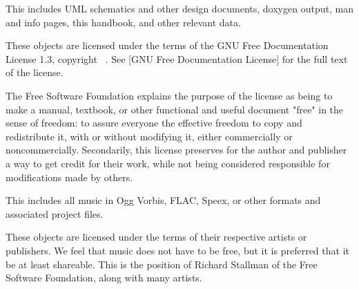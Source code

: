 
This includes UML schematics and other design documents, doxygen output, man and info pages, this handbook, and other relevant data.

These objects are licensed under the terms of the GNU Free Documentation License 1.3, copyright \CopyrightDates\ \CopyrightHolder. See [GNU Free Documentation License] for the full text of the license.

The Free Software Foundation explains the purpose of the license as being to make a manual, textbook, or other functional and useful document "free" in the sense of freedom: to assure everyone the effective freedom to copy and redistribute it, with or without modifying it, either commercially or noncommercially. Secondarily, this license preserves for the author and publisher a way to get credit for their work, while not being considered responsible for modifications made by others.


This includes all music in Ogg Vorbis, FLAC, Speex, or other formats and associated project files.

These objects are licensed under the terms of their respective artists or publishers. We feel that music does not have to be free, but it is preferred that it be at least shareable. This is the position of Richard Stallman of the Free Software Foundation, along with many artists.
\stopitemize

\StopChapter

